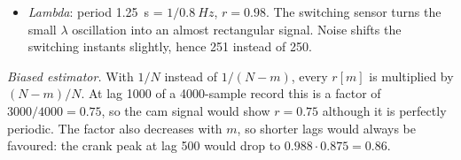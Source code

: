 \begin{solution}
\begin{itemize}
    cycle-to-cycle variations make each event an individual (aperiodic)
    transient.
  \item \emph{Lambda}: period \SI{1.25}{s} = $1/\SI{0.8}{Hz}$, $r=0.98$. The
    switching sensor turns the small $\lambda$ oscillation into an almost
    rectangular signal. Noise shifts the switching instants slightly, hence
    251 instead of 250.
\end{itemize}
\emph{Biased estimator.} With $1/N$ instead of $1/(N-m)$, every $r[m]$ is
multiplied by $(N-m)/N$. At lag 1000 of a 4000-sample record this is a factor
of $3000/4000=0.75$, so the cam signal would show $r=0.75$ although it is
perfectly periodic. The factor also decreases with $m$, so shorter lags would
always be favoured: the crank peak at lag 500 would drop to $0.988\cdot0.875=0.86$.
\end{solution}
\endgroup
